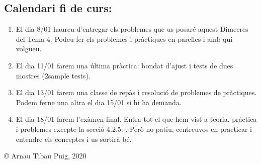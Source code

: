 \documentclass[letterpaper,10pt,english]{sphinxmanual}
\begin{document}
\subsection{Calendari fi de curs:}
\label{\detokenize{0_Intro/0_4_Tests:calendari-fi-de-curs}}\begin{enumerate}
%
\item {} 
El dia 8/01 haureu d’entregar els problemes que us posaré aquest Dimecres del Tema 4. Podeu fer els problemes i pràctiques en parelles i amb qui volgueu.

\item {} 
El dia 11/01 farem una última pràctica: bondat d’ajust i tests de dues mostres (2\sphinxhyphen{}sample tests).

\item {} 
El dia 13/01 farem una classe de repàs i resolució de problemes de pràctiques. Podem fer\sphinxhyphen{}ne una altra el dia 15/01 si hi ha demanda.

\item {} 
El dia 18/01 farem l’exàmen final. Entra tot el que hem vist a teoria, pràctica i problemes excepte la secció 4.2.5. . Però no patiu, centreu\sphinxhyphen{}vos en practicar i entendre els conceptes i us sortirà bé.

\end{enumerate}

© Arnau Tibau Puig, 2020 



\renewcommand{\indexname}{Index}
\printindex
\end{document}
